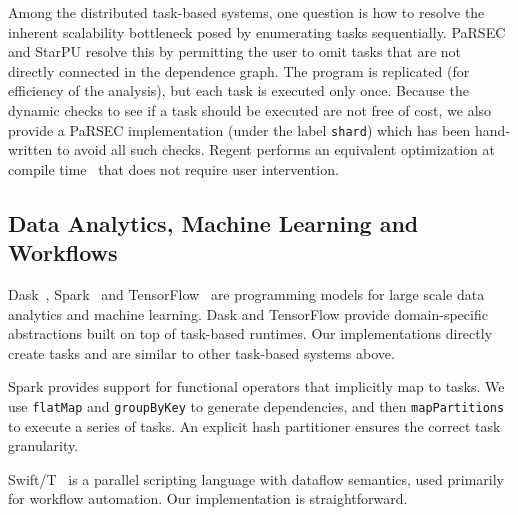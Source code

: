 Among the distributed task-based systems, one question is how to
resolve the inherent scalability bottleneck posed by enumerating tasks
sequentially. PaRSEC and StarPU resolve this by permitting the user to
omit tasks that are not directly connected in the dependence
graph. The program is replicated (for efficiency of the analysis), but
each task is executed only once. Because the dynamic checks to see if
a task should be executed are not free of cost, we also provide a
PaRSEC implementation (under the label \lstinline{shard}) which has
been hand-written to avoid all such checks. Regent performs an
equivalent optimization at compile time~\cite{ControlReplication17}
that does not require user intervention.

\subsection{Data Analytics, Machine Learning and Workflows}

Dask~\cite{Dask15}, Spark~\cite{Spark10} and
TensorFlow~\cite{TensorFlow15} are programming models for large scale
data analytics and machine learning. Dask and TensorFlow provide
domain-specific abstractions built on top of task-based runtimes. Our
implementations directly create tasks and are similar to other
task-based systems above.

Spark provides support for functional operators that implicitly map to
tasks. We use \lstinline[language=Scala]{flatMap} and
\lstinline[language=Scala]{groupByKey} to generate dependencies, and
then \lstinline[language=Scala]{mapPartitions} to execute a series of
tasks. An explicit hash partitioner ensures the correct task
granularity.

Swift/T~\cite{Wozniak13, Armstrong14} is a parallel scripting language
with dataflow semantics, used primarily for workflow automation. Our
implementation is straightforward.
